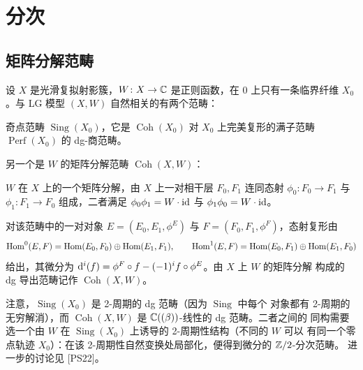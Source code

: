 \section{分次}

\subsection{矩阵分解范畴}

设 $X$ 是光滑复拟射影簇，$W\colon X\to\mathbb{C}$ 是正则函数，在 $0$ 上只有一条临界纤维
$X_0$。与 LG 模型 $(X,W)$ 自然相关的有两个范畴：

\begin{definition}\label{def:sing-cat}
奇点范畴 $\operatorname{Sing}(X_0)$，它是 $\operatorname{Coh}(X_0)$ 对 $X_0$ 上完美复形的满子范畴
$\operatorname{Perf}(X_0)$ 的 dg-商范畴。
\end{definition}

另一个是 $W$ 的矩阵分解范畴 $\operatorname{Coh}(X,W)$：

\begin{definition}\label{def:matrix-factorization}
$W$ 在 $X$ 上的一个矩阵分解，由 $X$ 上一对相干层 $F_0,F_1$ 连同态射
$\phi_0\colon F_0\to F_1$ 与 $\phi_1\colon F_1\to F_0$ 组成，二者满足
$\phi_0\phi_1=W\cdot\mathrm{id}$ 与 $\phi_1\phi_0=W\cdot\mathrm{id}$。
\end{definition}


对该范畴中的一对对象 $E=(E_0,E_1,\phi^E)$ 与 $F=(F_0,F_1,\phi^F)$，态射复形由
\[
\operatorname{Hom}^0(E,F)=\operatorname{Hom}(E_0,F_0)\oplus\operatorname{Hom}(E_1,F_1),\qquad
\operatorname{Hom}^1(E,F)=\operatorname{Hom}(E_0,F_1)\oplus\operatorname{Hom}(E_1,F_0)
\]
给出，其微分为 $\mathrm{d}^i(f)=\phi^F\circ f-(-1)^if\circ\phi^E$。由 $X$ 上 $W$ 的矩阵分解
构成的 dg 导出范畴记作 $\operatorname{Coh}(X,W)$。

注意，$\operatorname{Sing}(X_0)$ 是 2-周期的 dg 范畴（因为 $\operatorname{Sing}$ 中每个
对象都有 2-周期的无穷解消），而 $\operatorname{Coh}(X,W)$ 是 $\mathbb{C}((\beta))$-线性的 dg 范畴。二者之间的
同构需要选一个由 $W$ 在 $\operatorname{Sing}(X_0)$ 上诱导的 2-周期性结构（不同的 $W$ 可以
有同一个零点轨迹 $X_0$）：在该 2-周期性自然变换处局部化，便得到微分的 $\mathbb{Z}/2$-分次范畴。
进一步的讨论见 [PS22]。

